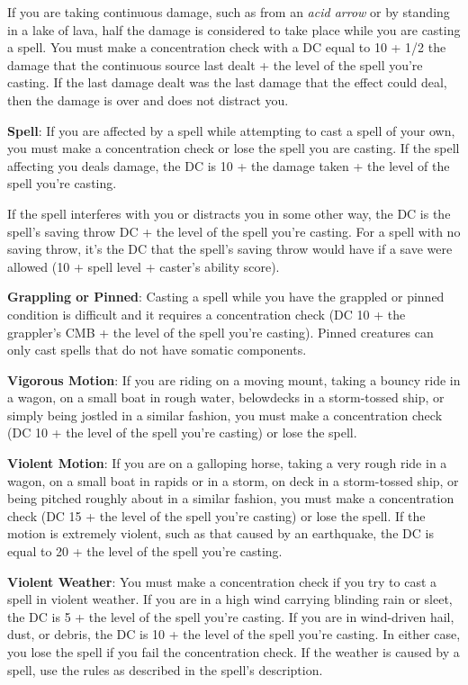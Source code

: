 If you are taking continuous damage, such as from an \textit{acid arrow} or by standing in a lake of lava, half the damage is considered to take place while you are casting a spell. You must make a concentration check with a DC equal to 10 + 1/2 the damage that the continuous source last dealt + the level of the spell you're casting. If the last damage dealt was the last damage that the effect could deal, then the damage is over and does not distract you.
				
\textbf{Spell}: If you are affected by a spell while attempting to cast a spell of your own, you must make a concentration check or lose the spell you are casting. If the spell affecting you deals damage, the DC is 10 + the damage taken + the level of the spell you're casting.
				
If the spell interferes with you or distracts you in some other way, the DC is the spell's saving throw DC + the level of the spell you're casting. For a spell with no saving throw, it's the DC that the spell's saving throw would have if a save were allowed (10 + spell level + caster's ability score).
				
\textbf{Grappling or Pinned}: Casting a spell while you have the grappled or pinned condition is difficult and it requires a concentration check (DC 10 + the grappler's CMB + the level of the spell you're casting). Pinned creatures can only cast spells that do not have somatic components.
				
\textbf{Vigorous Motion}: If you are riding on a moving mount, taking a bouncy ride in a wagon, on a small boat in rough water, belowdecks in a storm-tossed ship, or simply being jostled in a similar fashion, you must make a concentration check (DC 10 + the level of the spell you're casting) or lose the spell. 
				
\textbf{Violent Motion}: If you are on a galloping horse, taking a very rough ride in a wagon, on a small boat in rapids or in a storm, on deck in a storm-tossed ship, or being pitched roughly about in a similar fashion, you must make a concentration check (DC 15 + the level of the spell you're casting) or lose the spell. If the motion is extremely violent, such as that caused by an earthquake, the DC is equal to 20 + the level of the spell you're casting.
				
\textbf{Violent Weather}: You must make a concentration check if you try to cast a spell in violent weather. If you are in a high wind carrying blinding rain or sleet, the DC is 5 + the level of the spell you're casting. If you are in wind-driven hail, dust, or debris, the DC is 10 + the level of the spell you're casting. In either case, you lose the spell if you fail the concentration check. If the weather is caused by a spell, use the rules as described in the spell's description.
				
